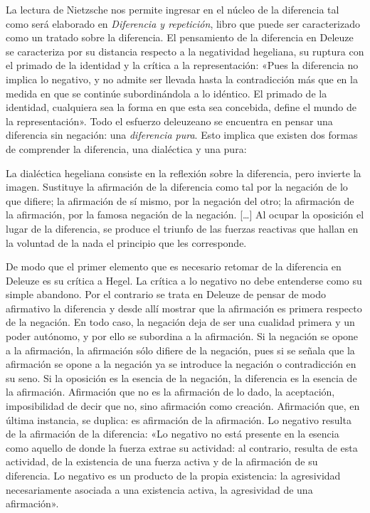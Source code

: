 La lectura de Nietzsche nos permite ingresar en el núcleo de la diferencia tal como será elaborado en \emph{Diferencia y repetición}, libro que puede ser caracterizado como un tratado sobre la diferencia. El pensamiento de la diferencia en Deleuze se caracteriza por su distancia respecto a la negatividad hegeliana, su ruptura con el primado de la identidad y la crítica a la representación: «Pues la diferencia no implica lo negativo, y no admite ser llevada hasta la contradicción más que en la medida en que se continúe subordinándola a lo idéntico. El primado de la identidad, cualquiera sea la forma en que esta sea concebida, define el mundo de la representación». Todo el esfuerzo deleuzeano se encuentra en pensar una diferencia sin negación: una\emph{ diferencia pura}. Esto implica que existen dos formas de comprender la diferencia, una dialéctica y una pura:

La dialéctica hegeliana consiste en la reflexión sobre la diferencia, pero invierte la imagen. Sustituye la afirmación de la diferencia como tal por la negación de lo que difiere; la afirmación de sí mismo, por la negación del otro; la afirmación de la afirmación, por la famosa negación de la negación. {[}\ldots{]} Al ocupar la oposición el lugar de la diferencia, se produce el triunfo de las fuerzas reactivas que hallan en la voluntad de la nada el principio que les corresponde.

De modo que el primer elemento que es necesario retomar de la diferencia en Deleuze es su crítica a Hegel. La crítica a lo negativo no debe entenderse como su simple abandono. Por el contrario se trata en Deleuze de pensar de modo afirmativo la diferencia y desde allí mostrar que la afirmación es primera respecto de la negación. En todo caso, la negación deja de ser una cualidad primera y un poder autónomo, y por ello se subordina a la afirmación. Si la negación se opone a la afirmación, la afirmación sólo difiere de la negación, pues si se señala que la afirmación se opone a la negación ya se introduce la negación o contradicción en su seno. Si la oposición es la esencia de la negación, la diferencia es la esencia de la afirmación. Afirmación que no es la afirmación de lo dado, la aceptación, imposibilidad de decir que no, sino afirmación como creación. Afirmación que, en última instancia, se duplica: es afirmación de la afirmación. Lo negativo resulta de la afirmación de la diferencia: «Lo negativo no está presente en la esencia como aquello de donde la fuerza extrae su actividad: al contrario, resulta de esta actividad, de la existencia de una fuerza activa y de la afirmación de su diferencia. Lo negativo es un producto de la propia existencia: la agresividad necesariamente asociada a una existencia activa, la agresividad de una afirmación».

